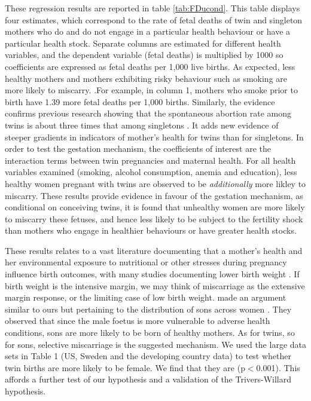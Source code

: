 \documentclass[subeqn]{article}
\begin{document}
\begin{spacing}{1.4}
These regression results are reported in table \ref{tab:FDucond}.  This table
displays four estimates, which correspond to the rate of fetal deaths of twin
and singleton mothers who do and do not engage in a particular health behaviour
or have a particular health stock.  Separate columns are estimated for different
health variables, and the dependent variable (fetal deaths) is multiplied by 1000
so coefficients are expressed as fetal deaths per 1,000 live births. As expected,
less healthy mothers and mothers exhibiting risky behaviour such as smoking are
more likely to miscarry.  .For example, in column 1, mothers who smoke prior to
birth have 1.39 more fetal deaths per 1,000 births.  Similarly, the evidence
confirms previous research showing that the spontaneous abortion rate among twins
is about three times that among singletons \citep{Boklage1990}. It adds new
evidence of steeper gradients in indicators of mother's health for twins than
for singletons.  In order to
test the gestation mechanism, the coefficients of interest are the interaction
terms between twin pregnancies and maternal health.  For all health variables 
examined (smoking, alcohol consumption, anemia and education), less healthy women
pregnant with twins are observed to be \emph{additionally} more likley to
miscarry. These results provide evidence in favour of the gestation mechanism,
as conditional on conceiving twins, it is found that unhealthy women are more 
likely to miscarry these fetuses, and hence less likely to be subject to the
fertility shock than mothers who engage in healthier behaviours or have greater
health stocks.

These results relates to a vast literature documenting that a mother's health and her environmental exposure to nutritional or other stresses during pregnancy influence birth outcomes, with many studies documenting lower birth weight \citep{CurrieMoretti2007,Bernsteinetal2005,QuintanaRodenas2014}. If birth weight is the intensive margin, we may think of miscarriage as the extensive margin response, or the limiting case of low birth weight. \citet{TriversWillard1973} made an argument similar to ours but pertaining to the distribution of sons across women \citep{TriversWillard1973,AlmondEdlund2007}. They observed that since the male foetus is more vulnerable to adverse health conditions, sons are more likely to be born of healthy mothers. As for twins, so for sons, selective miscarriage is the suggested mechanism. We used the large data sets in Table 1 (US, Sweden and the developing country data) to test whether twin births are more likely to be female. We find that they are (p$<$0.001). This affords a further test of our hypothesis and a validation of the Trivers-Willard hypothesis.


\end{spacing}
\end{document}
